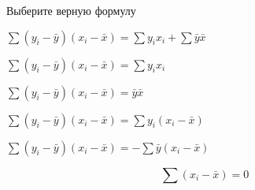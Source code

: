
\begin{question}
Выберите верную формулу
\begin{answerlist}
  \item \(\sum (y_i - \bar y)(x_i - \bar x) = \sum y_i x_i + \sum \bar y  \bar x\)
  \item \(\sum (y_i - \bar y)(x_i - \bar x) = \sum y_i x_i\)
  \item \(\sum (y_i - \bar y)(x_i - \bar x) = \bar y \bar x\)
  \item \(\sum (y_i - \bar y)(x_i - \bar x) = \sum y_i (x_i - \bar x)\)
  \item \(\sum (y_i - \bar y)(x_i - \bar x) = -\sum \bar y (x_i - \bar x)\)
\end{answerlist}
\end{question}

\begin{solution}
\[\sum (x_i - \bar x)=0\]
\end{solution}

